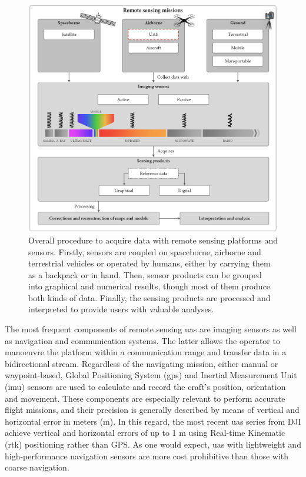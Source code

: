 \begin{figure}[!ht]
	\includegraphics{figs/introduction/introduction_scheme.png}
	\caption{Overall procedure to acquire data with remote sensing platforms and sensors. Firstly, sensors are coupled on spaceborne, airborne and terrestrial vehicles or operated by humans, either by carrying them as a backpack or in hand. Then, sensor products can be grouped into graphical and numerical results, though most of them produce both kinds of data. Finally, the sensing products are processed and interpreted to provide users with valuable analyses. }
    \label{fig:introduction_scheme}
\end{figure}

The most frequent components of remote sensing \acrshort{uas} are imaging sensors as well as navigation and communication systems. The latter allows the operator to manoeuvre the platform within a communication range and transfer data in a bidirectional stream. Regardless of the navigating mission, either manual or waypoint-based, Global Positioning System (\acrshort{gps}) and Inertial Measurement Unit (\acrshort{imu}) sensors are used to calculate and record the craft's position, orientation and movement. These components are especially relevant to perform accurate flight missions, and their precision is generally described by means of vertical and horizontal error in meters (\si{\meter}). In this regard, the most recent \acrshort{uas} series from DJI achieve vertical and horizontal errors of up to 1 \si{\meter} using Real-time Kinematic (\acrshort{rtk}) positioning rather than GPS. As one would expect, \acrshort{uas} with lightweight and high-performance navigation sensors are more cost prohibitive than those with coarse navigation.    

